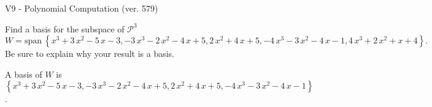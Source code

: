 \begin{exercise}
  \begin{exerciseTitle}V9 - Polynomial Computation (ver. 579)\end{exerciseTitle}
  \begin{exerciseStatement}
    Find a basis for the subspace of \(\mathcal{P}^3\) 
\[W=\mathrm{span}\ \left\{x^{3} + 3 \, x^{2} - 5 \, x - 3 , -3 \, x^{3} - 2 \, x^{2} - 4 \, x + 5 , 2 \, x^{2} + 4 \, x + 5 , -4 \, x^{3} - 3 \, x^{2} - 4 \, x - 1 , 4 \, x^{3} + 2 \, x^{2} + x + 4\right\}.\]
 Be sure to explain why your result is a basis.


  \end{exerciseStatement}
  \begin{exerciseAnswer}
   A basis of \(W\) is  \(\left\{x^{3} + 3 \, x^{2} - 5 \, x - 3 , -3 \, x^{3} - 2 \, x^{2} - 4 \, x + 5 , 2 \, x^{2} + 4 \, x + 5 , -4 \, x^{3} - 3 \, x^{2} - 4 \, x - 1\right\}\).
  


  \end{exerciseAnswer}
\end{exercise}